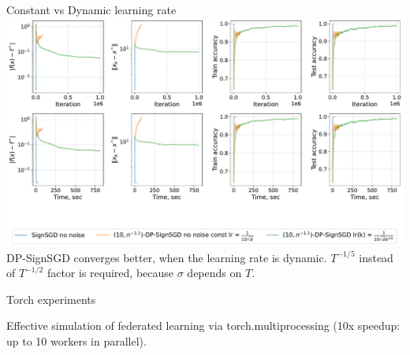 \documentclass{beamer}
\begin{document}
\begin{frame}{Constant vs Dynamic learning rate}
    \includegraphics[width=1.0\textwidth]{v28_dynamic_step/long/v28_dynamic_step_long.pdf} 
DP-SignSGD converges better, when the learning rate is dynamic. $T^{-1/5}$ instead of $T^{-1/2}$ factor is required, because $\sigma$ depends on $T$.
\end{frame}

\begin{frame}{Torch experiments}

Effective simulation of federated learning via torch.multiprocessing (10x speedup: up to 10 workers in parallel).  
\end{frame}
\end{document}
